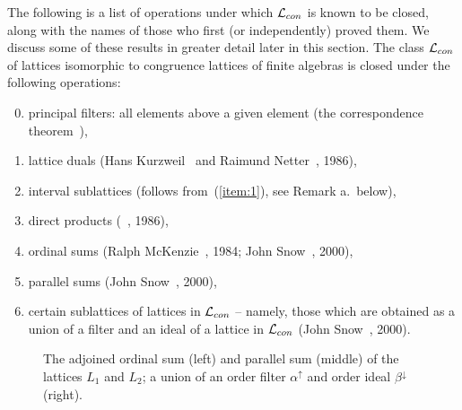 The following is a list of operations under which $\mathcal{L}_{con}$ is 
known to be closed,
along with the names of those who first (or independently) proved them.  
We discuss some of these results in greater detail later in this section.
The class $\mathcal{L}_{con}$ of lattices isomorphic to congruence lattices 
of finite algebras is closed under the following operations:
\begin{enumerate} %
\setcounter{enumi}{-1}
\item\label{item:0} principal filters: all elements above a 
given element (the correspondence theorem~\cite{Bergman2012}),
\item\label{item:1} lattice duals (Hans Kurzweil~\cite{Kurzweil:1985} 
and Raimund Netter~\cite{Netter:1986}, 1986),
\item\label{item:2} interval sublattices (follows from~(\ref{item:1}), see Remark a.~below),
\item  direct products (\Jiri \Tuma~\cite{Tuma:1986}, 1986), 
\item  ordinal sums 
  (Ralph McKenzie~\cite{McKenzie:1984}, 1984; John Snow~\cite{Snow:2000}, 2000),
\item  parallel sums (John Snow~\cite{Snow:2000}, 2000), 
\item\label{item:6} certain sublattices of lattices in $\mathcal{L}_{con}$ -- namely, those which
  are obtained as a union of a filter and an ideal of a lattice in
  $\mathcal{L}_{con}$ (John Snow~\cite{Snow:2000}, 2000). 
\end{enumerate}
\begin{center}
  \begin{figure}[h!]
    \centering
    \hskip5mm
    \hskip5mm
    \caption{The adjoined ordinal sum (left) and parallel sum (middle) 
      of the lattices $L_1$ and $L_2$; a union of an order filter
      $\alpha^\uparrow$ and order ideal $\beta^\downarrow$ (right).}
    \label{fig:ord_par_fil-uni}
  \end{figure}
\end{center}

